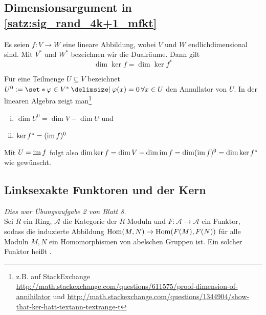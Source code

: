 \subsection{Dimensionsargument in \autoref{satz:sig_rand_4k+1_mfkt}} %
\label{sub:dimensionsargument_rand_mfkt}
Es seien $f \colon V \to W$ eine lineare Abbildung, wobei $V$ und $W$ endlichdimensional sind. 
Mit $V^*$ und $W^*$ bezeichnen wir die Dualräume.
Dann gilt
\[
	\dim \ker f = \dim \ker f^*
\]
\begin{beweis}
	Für eine Teilmenge $U \subseteq V$ bezeichnet $U^0 := \set*{\varphi \in V^* \given \varphi(x)=0 \,\forall x \in U}$ den Annullator von $U$.
	In der linearen Algebra zeigt man\footnote{z.B. auf StackExchange \url{http://math.stackexchange.com/questions/611575/proof-dimension-of-annihilator} und \url{http://math.stackexchange.com/questions/1344904/show-that-ker-hatt-textann-textrange-t}}
	\begin{enumerate}[(i)]
		\item $\dim U^0 = \dim V - \dim U$ und
		\item $\ker f^* = (\operatorname{im} f)^0$
	\end{enumerate}
	Mit $U= \operatorname{im} f$ folgt also
	\(
		\dim \ker f = \dim V - \dim \operatorname{im} f = \dim (\operatorname{im} f)^0 = \dim \ker f^* 
	\) wie gewünscht.
\end{beweis}

\subsection{Linksexakte Funktoren und der Kern} %
\label{sub:exakte_funktoren_und_der_kern}
\emph{Dies war Übungsaufgabe 2 von Blatt 8.}\smallskip \\
Sei $R$ ein Ring, $\mathcal{A}$ die Kategorie der $R$-Moduln und $F \colon \mathcal{A} \to \mathcal{A}$ ein Funktor, sodass die induzierte Abbildung $\Hom(M,N) \to \Hom \enbrace*{F(M), F(N)}$ für alle Moduln $M,N$ ein Homomorphismen von abelschen Gruppen ist. 
Ein solcher Funktor heißt .

